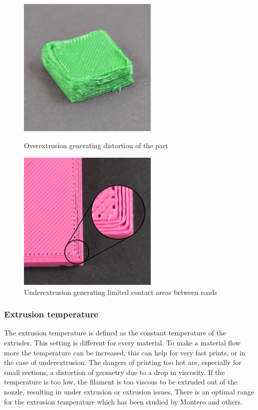 \begin{figure}
\centering
\begin{minipage}{.5\textwidth}
  \centering
    \includegraphics[width=0.6\textwidth]{chapter_2/figures/overextrusion.jpg}
    \caption{Overextrusion generating distortion of the part \cite{Simplefy3DPrintGuide}}
    \label{fig:overextrusion}
\end{minipage}%
\begin{minipage}{.5\textwidth}
  \centering
    \includegraphics[width=0.6\textwidth]{chapter_2/figures/underextrusion.jpg}
    \caption{Underextrusion generating limited contact areas between roads \cite{Simplefy3DPrintGuide}}
    \label{fig:underextrusion}
\end{minipage}
\end{figure}

\subsubsection {Extrusion temperature }
The extrusion temperature is defined as the constant temperature of the extruder. This setting is different for every material. To make a material flow more the temperature can be increased, this can help for very fast prints, or in the case of underextrusion. The dangers of printing too hot are, especially for small sections, a distortion of geometry due to a drop in viscosity. If the temperature is too low, the filament is too viscous to be extruded out of the nozzle, resulting in under extrusion or extrusion issues.  
There is an optimal range for the extrusion temperature which has been studied by Montero \cite{Montero2001MaterialExperiments} and others.

